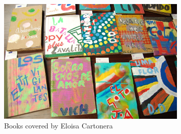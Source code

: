 \begin{itemize}
  \begin{figure}[ht]
      \centering
      \includegraphics[height=6cm]{graphics/EloisaCartonera_Books2.jpg}
      \caption{Books covered by Eloisa Cartonera}
      \label{fig:EloisaCartonera_Books}
  \end{figure}





\end{itemize}
